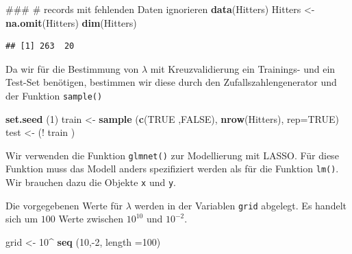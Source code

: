 \documentclass[]{book}
\newenvironment{Shaded}{\begin{snugshade}}{\end{snugshade}}
\newcommand{\KeywordTok}[1]{\textcolor[rgb]{0.13,0.29,0.53}{\textbf{{#1}}}}
\newcommand{\DataTypeTok}[1]{\textcolor[rgb]{0.13,0.29,0.53}{{#1}}}
\newcommand{\DecValTok}[1]{\textcolor[rgb]{0.00,0.00,0.81}{{#1}}}
\newcommand{\StringTok}[1]{\textcolor[rgb]{0.31,0.60,0.02}{{#1}}}
\newcommand{\OtherTok}[1]{\textcolor[rgb]{0.56,0.35,0.01}{{#1}}}
\newcommand{\NormalTok}[1]{{#1}}
\begin{document}
\begin{Shaded}
\begin{Highlighting}[]
\NormalTok{### # records mit fehlenden Daten ignorieren}
\KeywordTok{data}\NormalTok{(Hitters)}
\NormalTok{Hitters <-}\StringTok{ }\KeywordTok{na.omit}\NormalTok{(Hitters)}
\KeywordTok{dim}\NormalTok{(Hitters)}
\end{Highlighting}
\end{Shaded}

\begin{verbatim}
## [1] 263  20
\end{verbatim}

Da wir für die Bestimmung von \(\lambda\) mit Kreuzvalidierung ein
Trainings- und ein Test-Set benötigen, bestimmen wir diese durch den
Zufallszahlengenerator und der Funktion \texttt{sample()}

\begin{Shaded}
\begin{Highlighting}[]
\KeywordTok{set.seed} \NormalTok{(}\DecValTok{1}\NormalTok{)}
\NormalTok{train <-}\StringTok{ }\KeywordTok{sample} \NormalTok{(}\KeywordTok{c}\NormalTok{(}\OtherTok{TRUE} \NormalTok{,}\OtherTok{FALSE}\NormalTok{), }\KeywordTok{nrow}\NormalTok{(Hitters), }\DataTypeTok{rep=}\OtherTok{TRUE}\NormalTok{)}
\NormalTok{test  <-}\StringTok{ }\NormalTok{(!}\StringTok{ }\NormalTok{train )}
\end{Highlighting}
\end{Shaded}

Wir verwenden die Funktion \texttt{glmnet()} zur Modellierung mit LASSO.
Für diese Funktion muss das Modell anders spezifiziert werden als für
die Funktion \texttt{lm()}. Wir brauchen dazu die Objekte \texttt{x} und
\texttt{y}.

\begin{Shaded}
\end{Shaded}

Die vorgegebenen Werte für \(\lambda\) werden in der Variablen
\texttt{grid} abgelegt. Es handelt sich um \(100\) Werte zwischen
\(10^10\) und \(10^{-2}\).

\begin{Shaded}
\begin{Highlighting}[]
\NormalTok{grid <-}\StringTok{ }\DecValTok{10}\NormalTok{^}\StringTok{ }\KeywordTok{seq} \NormalTok{(}\DecValTok{10}\NormalTok{,-}\DecValTok{2}\NormalTok{, }\DataTypeTok{length =}\DecValTok{100}\NormalTok{)}
\end{Highlighting}
\end{Shaded}
\end{document}
